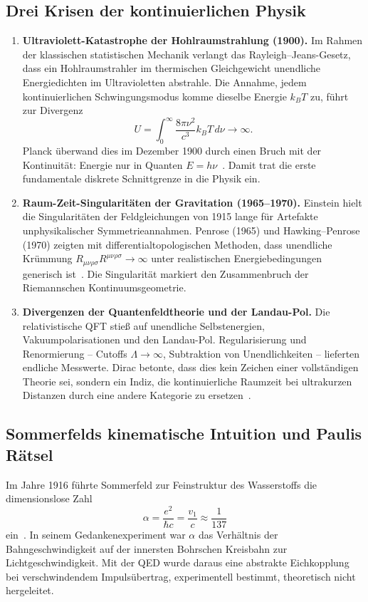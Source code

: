 \documentclass[11pt,a4paper]{article}
\theoremstyle{definition}
\theoremstyle{remark}
\numberwithin{equation}{section}
\begin{document}
\subsection{Drei Krisen der kontinuierlichen Physik}
\begin{enumerate}
\item \textbf{Ultraviolett-Katastrophe der Hohlraumstrahlung (1900).}
Im Rahmen der klassischen statistischen Mechanik verlangt das Rayleigh--Jeans-Gesetz, dass ein Hohlraumstrahler im thermischen Gleichgewicht unendliche Energiedichten im Ultravioletten abstrahle.
Die Annahme, jedem kontinuierlichen Schwingungsmodus komme dieselbe Energie $k_B T$ zu, führt zur Divergenz
\begin{equation}
U=\int_0^\infty \frac{8\pi\nu^2}{c^3}k_B T\,d\nu\longrightarrow\infty.
\end{equation}
Planck überwand dies im Dezember 1900 durch einen Bruch mit der Kontinuität: Energie nur in Quanten $E=h\nu$~\cite{planck1900}.
Damit trat die erste fundamentale diskrete Schnittgrenze in die Physik ein.

\item \textbf{Raum-Zeit-Singularitäten der Gravitation (1965--1970).}
Einstein hielt die Singularitäten der Feldgleichungen von 1915 lange für Artefakte unphysikalischer Symmetrieannahmen.
Penrose (1965) und Hawking--Penrose (1970) zeigten mit differentialtopologischen Methoden, dass unendliche Krümmung $R_{\mu\nu\rho\sigma}R^{\mu\nu\rho\sigma}\to\infty$ unter realistischen Energiebedingungen generisch ist~\cite{penrose1965,hawking1970}.
Die Singularität markiert den Zusammenbruch der Riemannschen Kontinuumsgeometrie.

\item \textbf{Divergenzen der Quantenfeldtheorie und der Landau-Pol.}
Die relativistische QFT stieß auf unendliche Selbstenergien, Vakuumpolarisationen und den Landau-Pol.
Regularisierung und Renormierung -- Cutoffs $\Lambda\to\infty$, Subtraktion von Unendlichkeiten -- lieferten endliche Messwerte.
Dirac betonte, dass dies kein Zeichen einer vollständigen Theorie sei, sondern ein Indiz, die kontinuierliche Raumzeit bei ultrakurzen Distanzen durch eine andere Kategorie zu ersetzen~\cite{dirac1975}.
\end{enumerate}

\subsection{Sommerfelds kinematische Intuition und Paulis Rätsel}
Im Jahre 1916 führte Sommerfeld zur Feinstruktur des Wasserstoffs die dimensionslose Zahl
\begin{equation}
\alpha=\frac{e^2}{\hbar c}=\frac{v_1}{c}\approx\frac{1}{137}
\end{equation}
ein~\cite{sommerfeld1916}.
In seinem Gedankenexperiment war $\alpha$ das Verhältnis der Bahngeschwindigkeit auf der innersten Bohrschen Kreisbahn zur Lichtgeschwindigkeit.
Mit der QED wurde daraus eine abstrakte Eichkopplung bei verschwindendem Impulsübertrag, experimentell bestimmt, theoretisch nicht hergeleitet.
\end{document}
